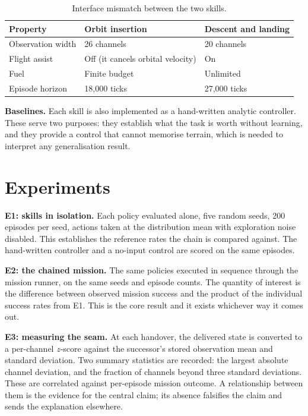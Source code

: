 \documentclass[11pt]{article}
\begin{document}
\begin{table}[h]
\centering
\caption{Interface mismatch between the two skills.}
\label{tab:mismatch}
\begin{tabular}{lll}
\toprule
\textbf{Property} & \textbf{Orbit insertion} & \textbf{Descent and landing} \\
\midrule
Observation width & 26 channels & 20 channels \\
Flight assist & Off (it cancels orbital velocity) & On \\
Fuel & Finite budget & Unlimited \\
Episode horizon & 18{,}000 ticks & 27{,}000 ticks \\
\bottomrule
\end{tabular}
\end{table}

\textbf{Baselines.} Each skill is also implemented as a hand-written analytic
controller. These serve two purposes: they establish what the task is worth without
learning, and they provide a control that cannot memorise terrain, which is needed to
interpret any generalisation result.

\section{Experiments}

\textbf{E1: skills in isolation.} Each policy evaluated alone, five random seeds,
200 episodes per seed, actions taken at the distribution mean with exploration noise
disabled. This establishes the reference rates the chain is compared against. The
hand-written controller and a no-input control are scored on the same episodes.

\textbf{E2: the chained mission.} The same policies executed in sequence through the
mission runner, on the same seeds and episode counts. The quantity of interest is the
difference between observed mission success and the product of the individual success
rates from E1. This is the core result and it exists whichever way it comes out.

\textbf{E3: measuring the seam.} At each handover, the delivered state is converted to
a per-channel $z$-score against the successor's stored observation mean and standard
deviation. Two summary statistics are recorded: the largest absolute channel deviation,
and the fraction of channels beyond three standard deviations. These are correlated
against per-episode mission outcome. A relationship between them is the evidence for
the central claim; its absence falsifies the claim and sends the explanation elsewhere.
\end{document}
